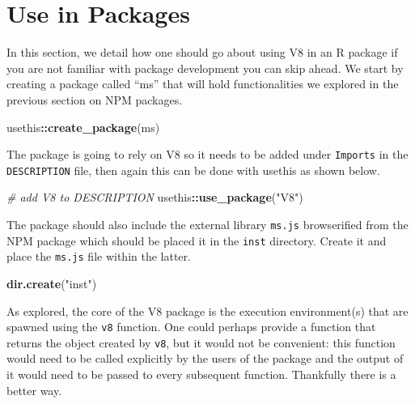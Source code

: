 \documentclass[
]{krantz}
\makeatletter
\newenvironment{Shaded}{\begin{snugshade}}{\end{snugshade}}
\newcommand{\CommentTok}[1]{\textcolor[rgb]{0.37,0.37,0.37}{\textit{#1}}}
\newcommand{\KeywordTok}[1]{\textcolor[rgb]{0.27,0.27,0.27}{\textbf{#1}}}
\newcommand{\NormalTok}[1]{#1}
\newcommand{\OperatorTok}[1]{\textcolor[rgb]{0.43,0.43,0.43}{\textbf{#1}}}
\newcommand{\StringTok}[1]{\textcolor[rgb]{0.5,0.5,0.5}{#1}}
\newenvironment{kframe}{%
\medskip{}
\setlength{\fboxsep}{.8em}
 \def\at@end@of@kframe{}%
 \ifinner\ifhmode%
  \def\at@end@of@kframe{\end{minipage}}%
  \begin{minipage}{\columnwidth}%
 \fi\fi%
 \def\FrameCommand##1{\hskip\@totalleftmargin \hskip-\fboxsep
 \colorbox{shadecolor}{##1}\hskip-\fboxsep
     \hskip-\linewidth \hskip-\@totalleftmargin \hskip\columnwidth}%
 \MakeFramed {\advance\hsize-\width
   \@totalleftmargin\z@ \linewidth\hsize
   \@setminipage}}%
 {\par\unskip\endMakeFramed%
 \at@end@of@kframe}
\renewenvironment{Shaded}{\begin{kframe}}{\end{kframe}}
\makeatother
\begin{document}
\hypertarget{v8-pkg}{%
\section{Use in Packages}\label{v8-pkg}}

In this section, we detail how one should go about using V8 in an R package if you are not familiar with package development you can skip ahead. We start by creating a package called ``ms'' that will hold functionalities we explored in the previous section on NPM packages.

\begin{Shaded}
\begin{Highlighting}[]
\NormalTok{usethis}\OperatorTok{::}\KeywordTok{create\_package}\NormalTok{(}\StringTok{\textquotesingle{}ms\textquotesingle{}}\NormalTok{)}
\end{Highlighting}
\end{Shaded}

The package is going to rely on V8 so it needs to be added under \texttt{Imports} in the \texttt{DESCRIPTION} file, then again this can be done with usethis as shown below.

\begin{Shaded}
\begin{Highlighting}[]
\CommentTok{\# add V8 to DESCRIPTION}
\NormalTok{usethis}\OperatorTok{::}\KeywordTok{use\_package}\NormalTok{(}\StringTok{"V8"}\NormalTok{)}
\end{Highlighting}
\end{Shaded}

The package should also include the external library \texttt{ms.js} browserified from the NPM package which should be placed it in the \texttt{inst} directory. Create it and place the \texttt{ms.js} file within the latter.

\begin{Shaded}
\begin{Highlighting}[]
\KeywordTok{dir.create}\NormalTok{(}\StringTok{"inst"}\NormalTok{)}
\end{Highlighting}
\end{Shaded}

As explored, the core of the V8 package is the execution environment(s) that are spawned using the \texttt{v8} function. One could perhaps provide a function that returns the object created by \texttt{v8}, but it would not be convenient: this function would need to be called explicitly by the users of the package and the output of it would need to be passed to every subsequent function. Thankfully there is a better way.
\end{document}
